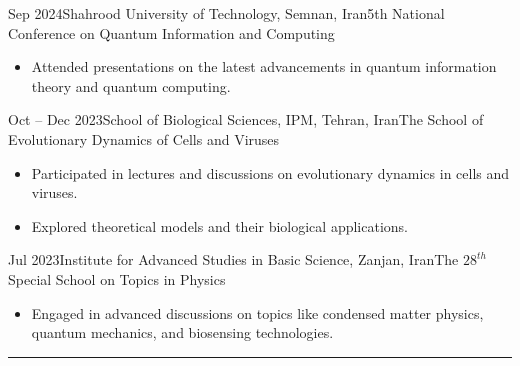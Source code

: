 \documentclass[12pt, b4paper]{cv}
\begin{document}
\begin{school}{Sep 2024}{Shahrood University of Technology, Semnan, Iran}{5th National Conference on Quantum Information and Computing}
\vspace{-0.1in}
	\begin{itemize}
	    \item Attended presentations on the latest advancements in quantum information theory and quantum computing.
	\end{itemize}
\end{school}


\begin{school}{Oct -- Dec 2023}{School of Biological Sciences, IPM, Tehran, Iran}{The School of Evolutionary Dynamics of Cells and Viruses}
\vspace{-0.1in}
	\begin{itemize}
	    \item Participated in lectures and discussions on evolutionary dynamics in cells and viruses.
	    \item Explored theoretical models and their biological applications.
	\end{itemize}
\end{school}


\begin{school}{Jul 2023}{Institute for Advanced Studies in Basic Science, Zanjan, Iran}{The $28^{th}$ Special School on Topics in Physics}
\vspace{-0.1in}
	\begin{itemize}
	    \item Engaged in advanced discussions on topics like condensed matter physics, quantum mechanics, and biosensing technologies.
	\end{itemize}
\end{school}



\vspace{-0.15in}
\rule{\textwidth}{1pt}\\
\vspace{-0.15in}





\end{document}

